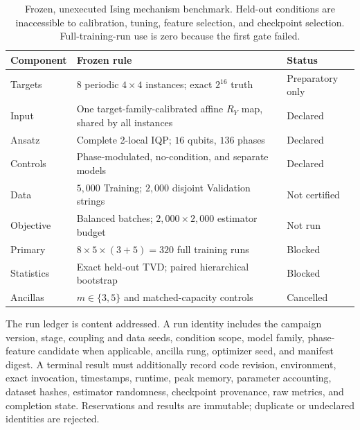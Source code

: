 \documentclass[a4paper,twocolumn,11pt,unpublished]{quantumarticle}
\begin{document}
\begin{table}[t]
\centering
\caption{Frozen, unexecuted Ising mechanism benchmark. Held-out conditions are
inaccessible to calibration, tuning, feature selection, and checkpoint
selection. Full-training-run use is zero because the first gate failed.}
\label{tab:protocol}
\small
\begin{tabular}{lll}
\toprule
Component & Frozen rule & Status \\
\midrule
Targets & $8$ periodic $4\times4$ instances; exact $2^{16}$ truth & Preparatory only \\
Input & One target-family-calibrated affine $R_Y$ map, shared by all instances & Declared \\
Ansatz & Complete 2-local IQP; $16$ qubits, $136$ phases & Declared \\
Controls & Phase-modulated, no-condition, and separate models & Declared \\
Data & $5{,}000$ Training; $2{,}000$ disjoint Validation strings & Not certified \\
Objective & Balanced batches; $2{,}000\times2{,}000$ estimator budget & Not run \\
Primary & $8\times5\times(3+5)=320$ full training runs & Blocked \\
Statistics & Exact held-out TVD; paired hierarchical bootstrap & Blocked \\
Ancillas & $m\in\{3,5\}$ and matched-capacity controls & Cancelled \\
\bottomrule
\end{tabular}
\end{table}

The run ledger is content addressed.  A run identity includes the campaign
version, stage, coupling and data seeds, condition scope, model family,
phase-feature candidate when applicable, ancilla rung, optimizer seed, and
manifest digest.  A terminal result must additionally record code revision,
environment, exact invocation, timestamps, runtime, peak memory, parameter
accounting, dataset hashes, estimator randomness, checkpoint provenance, raw
metrics, and completion state.  Reservations and results are immutable;
duplicate or undeclared identities are rejected.
\end{document}
